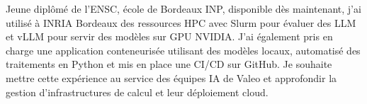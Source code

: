 
\begin{cvparagraph}
Jeune diplômé de l’ENSC, école de Bordeaux INP, disponible dès maintenant, j’ai utilisé à INRIA Bordeaux des ressources HPC avec Slurm pour évaluer des LLM et vLLM pour servir des modèles sur GPU NVIDIA. J’ai également pris en charge une application conteneurisée utilisant des modèles locaux, automatisé des traitements en Python et mis en place une CI/CD sur GitHub. Je souhaite mettre cette expérience au service des équipes IA de Valeo et approfondir la gestion d’infrastructures de calcul et leur déploiement cloud.
\end{cvparagraph}
